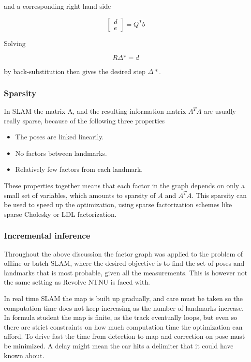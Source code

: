 and a corresponding right hand side

\begin{equation}
    \begin{bmatrix} d \\ e \end{bmatrix} = Q^Tb
\end{equation}

Solving 

\begin{equation}
    R\Delta* = d
\end{equation}

by back-substitution then gives the desired step $\Delta*$.

\subsubsection{Sparsity}

In SLAM the matrix A, and the resulting information matrix $A^TA$ are usually really sparse, because of the following three properties

\begin{itemize}
    \item The poses are linked linearily.
    \item No factors between landmarks.
    \item Relatively few factors from each landmark.
\end{itemize}

These properties together means that each factor in the graph depends on only a small set of variables, which amounts to sparsity of $A$ and $A^TA$. This sparsity can be used to speed up the optimization, using sparse factorization schemes like sparse Cholesky or LDL factorization\cite{SparseLinearAlgebra}. 

\subsubsection{Incremental inference}

Throughout the above discussion the factor graph was applied to the problem of offline or batch SLAM, where the desired objective is to find the set of poses and landmarks that is most probable, given all the measurements. This is however not the same setting as Revolve NTNU is faced with. 

In real time SLAM the map is built up gradually, and care must be taken so the computation time does not keep increasing as the number of landmarks increase. In formula student the map is finite, as the track eventually loops, but even so there are strict constraints on how much computation time the optimization can afford. To drive fast the time from detection to map and correction on pose must be minimized. A delay might mean the car hits a delimiter that it could have known about.

